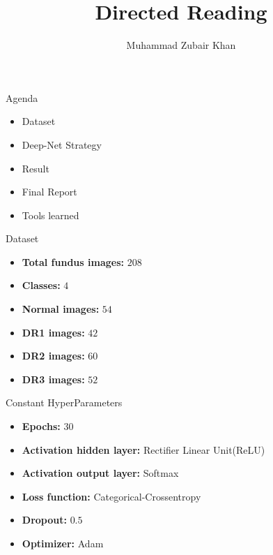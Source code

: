 \documentclass{beamer}
\title{Directed Reading}
\author{Muhammad Zubair Khan}
\begin{document}
\begin{frame}
\titlepage
\end{frame}

\begin{frame}{Agenda}
\begin{itemize}
\item Dataset 
\item Deep-Net Strategy
\item Result
\item Final Report   
\item Tools learned
\end{itemize}
\end{frame}

\begin{frame}[t]{Dataset}
\begin{itemize}
\item \textbf{Total fundus images:} $208$
\item \textbf{Classes:} $4$ 
\item \textbf{Normal images:} $54$
\item \textbf{DR1 images:} $42$
\item \textbf{DR2 images:} $60$
\item \textbf{DR3 images:} $52$
\end{itemize}
\end{frame}

\begin{frame}{Constant HyperParameters}
\begin{itemize}
\item \textbf{Epochs:} $30$
\item \textbf{Activation hidden layer:} Rectifier Linear Unit(ReLU)
\item \textbf{Activation output layer:} Softmax
\item \textbf{Loss function:} Categorical-Crossentropy
\item \textbf{Dropout:} $0.5$
\item \textbf{Optimizer:} Adam
\end{itemize}
\end{frame}
\end{document}
